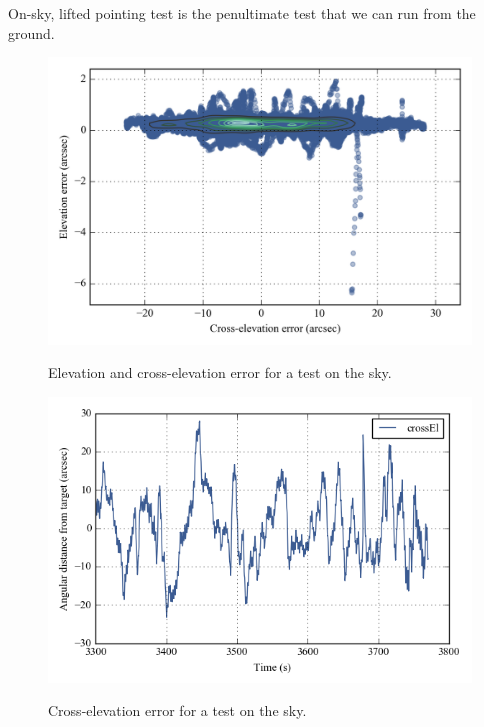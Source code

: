 On-sky, lifted pointing test is the penultimate test that we can run from the ground. 
\begin{figure}[!h]
\begin{center}
\includegraphics{Figures/simple2DPlot_crossEl_elevation.png}
\label{fig:simple2DPlot_crossEl_elevation}
\vspace{-0.5cm}
\caption[Elevation and cross-elevation error]{Elevation and cross-elevation error  for a test on the sky.}
\end{center}
\end{figure}

\begin{figure}[!h]
\begin{center}
\includegraphics{Figures/crossEl_outside.png}
\label{fig:crossEl_outside}
\vspace{-0.5cm}
\caption[Cross-elevation error]{Cross-elevation error for a test on the sky.}
\end{center}
\end{figure}



